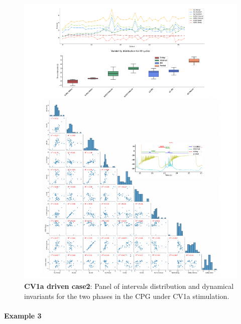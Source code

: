 \begin{figure}[htbp]
	\centering
	\includegraphics[width=1.1\textwidth]{./invariants/data/SUSSEX/CV1a_driven2/images/panel_with_pairplot.pdf}
	
	\caption{\textbf{CV1a driven case2}: Panel of intervals distribution and dynamical invariants for the two phases in the CPG under CV1a stimulation.}
	\label{fig:cv1a 2 2phases pairplot}
\end{figure}




\paragraph{\large{Example 3}}


